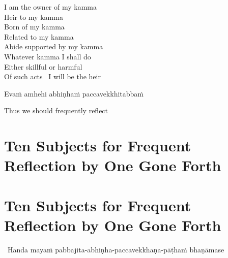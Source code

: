 \ifbfive\clearpage\fi

\begin{english-verses}
  I am the owner of my kamma\\
  Heir to my kamma\\
  Born of my kamma\\
  Related to my kamma\\
  Abide supported by my kamma\\
  Whatever kamma I shall do\\
  Either skillful or harmful\\
  Of such acts \breathmark\ I will be the heir\ifdigital\makeatletter\hyperlink{endnote98-appendix}\makeatother\fi
\end{english-verses}

Evaṁ amhehi abhiṇhaṁ paccavekkhitabbaṁ

\begin{english}
  Thus we should frequently reflect\ifdigital\makeatletter\hyperlink{endnote146-appendix}\makeatother\fi
\end{english}

\suttaRef{[AN 5.57]}

\ifdigital{}\fi



\ifninebythirteen
\section[Ten Subjects for Frequent Reflection\\ by One Gone Forth]{Ten Subjects for Frequent Reflection by One Gone Forth}
\else
\section{Ten Subjects for Frequent Reflection by One Gone Forth}
\fi
\label{ten-reflections}

\begin{leader}
  \anglebracketleft\ \hspace{-0.5mm}Handa mayaṁ pabbajita-abhiṇha-paccavekkhaṇa-pāṭhaṁ bhaṇāmase \hspace{-0.5mm}\anglebracketright\
\end{leader}

